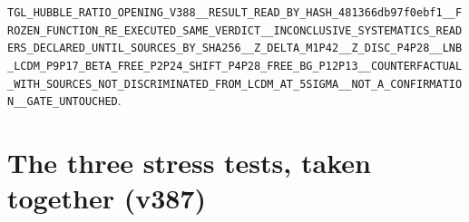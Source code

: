 \documentclass[11pt]{article}
\theoremstyle{definition}\newtheorem{deriv}{Derivation}
\begin{document}
\texttt{TGL\_\allowbreak{}HUBBLE\_\allowbreak{}RATIO\_\allowbreak{}OPENING\_\allowbreak{}V388\_\allowbreak{}\_\allowbreak{}RESULT\_\allowbreak{}READ\_\allowbreak{}BY\_\allowbreak{}HASH\_\allowbreak{}481366db97f0ebf1\_\allowbreak{}\_\allowbreak{}FROZEN\_\allowbreak{}FUNCTION\_\allowbreak{}RE\_\allowbreak{}EXECUTED\_\allowbreak{}SAME\_\allowbreak{}VERDICT\_\allowbreak{}\_\allowbreak{}INCONCLUSIVE\_\allowbreak{}SYSTEMATICS\_\allowbreak{}READERS\_\allowbreak{}DECLARED\_\allowbreak{}UNTIL\_\allowbreak{}SOURCES\_\allowbreak{}BY\_\allowbreak{}SHA256\_\allowbreak{}\_\allowbreak{}Z\_\allowbreak{}DELTA\_\allowbreak{}M1P42\_\allowbreak{}\_\allowbreak{}Z\_\allowbreak{}DISC\_\allowbreak{}P4P28\_\allowbreak{}\_\allowbreak{}LNB\_\allowbreak{}LCDM\_\allowbreak{}P9P17\_\allowbreak{}BETA\_\allowbreak{}FREE\_\allowbreak{}P2P24\_\allowbreak{}SHIFT\_\allowbreak{}P4P28\_\allowbreak{}FREE\_\allowbreak{}BG\_\allowbreak{}P12P13\_\allowbreak{}\_\allowbreak{}COUNTERFACTUAL\_\allowbreak{}WITH\_\allowbreak{}SOURCES\_\allowbreak{}NOT\_\allowbreak{}DISCRIMINATED\_\allowbreak{}FROM\_\allowbreak{}LCDM\_\allowbreak{}AT\_\allowbreak{}5SIGMA\_\allowbreak{}\_\allowbreak{}NOT\_\allowbreak{}A\_\allowbreak{}CONFIRMATION\_\allowbreak{}\_\allowbreak{}GATE\_\allowbreak{}UNTOUCHED}.

\section*{The three stress tests, taken together (v387)}

\end{document}
